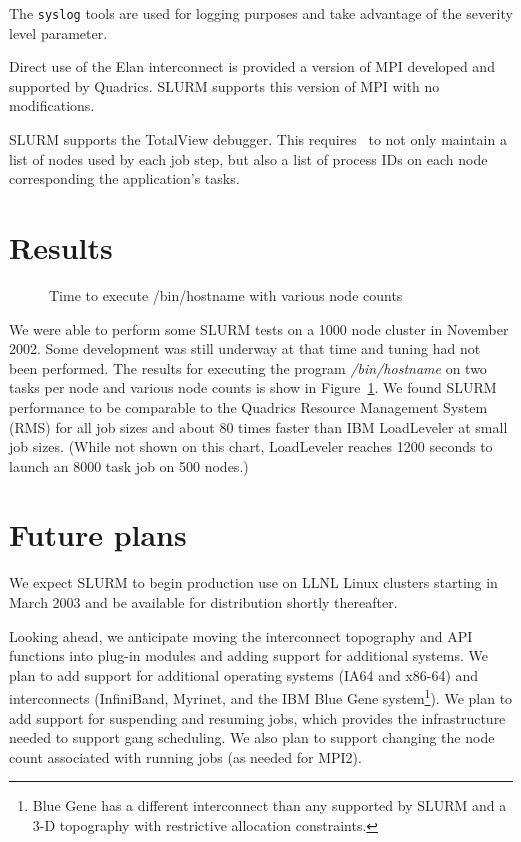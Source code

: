 The {\tt syslog} tools are used for logging purposes and take advantage of the 
severity level parameter.

Direct use of the Elan interconnect is provided a version of MPI developed 
and supported by Quadrics. SLURM supports this version of MPI with no modifications. 

SLURM supports the TotalView debugger\cite{Etnus2002}. 
This requires \srun\ to not only maintain a list of nodes used by each 
job step, but also a list of process IDs on each node corresponding 
the application's tasks.

\section{Results}

\begin{figure}[htb]
\centerline{}
\caption{Time to execute /bin/hostname with various node counts}
\label{timing}
\end{figure}

We were able to perform some SLURM tests on a 1000 node cluster in 
November 2002. Some development was still underway at that time and 
tuning had not been performed. The results for executing the program 
{\em /bin/hostname} on two tasks per node and various node counts is show 
in Figure~\ref{timing}. We found SLURM performance to be comparable 
to the Quadrics Resource Management System (RMS)\cite{Quadrics2002} 
for all job sizes and about 80 times faster than IBM 
LoadLeveler\cite{LL2002} at small job sizes.
(While not shown on this chart, LoadLeveler reaches 1200 seconds to 
launch an 8000 task job on 500 nodes.)

\section{Future plans}

We expect SLURM to begin production use on LLNL Linux clusters 
starting in March 2003 and be available for distribution shortly 
thereafter. 

Looking ahead, we anticipate moving the interconnect topography 
and API functions into plug-in modules and adding support for 
additional systems. 
We plan to add support for additional operating systems 
(IA64 and x86-64) and interconnects (InfiniBand, Myrinet, and 
the IBM Blue Gene\cite{BlueGene2002} system\footnote{Blue Gene 
has a different interconnect than any supported by SLURM and 
a 3-D topography with restrictive allocation constraints.}). 
We plan to add support for suspending and resuming jobs, which 
provides the infrastructure needed to support gang scheduling. 
We also plan to support changing the node count associated 
with running jobs (as needed for MPI2).

